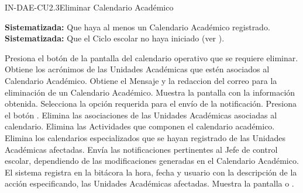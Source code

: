 \begin{UseCase}{IN-DAE-CU2.3}{Eliminar Calendario Académico}
{\begin{Titemize}
			\Titem \textbf{Sistematizada:} Que haya al menos un Calendario Académico registrado.
			\Titem \textbf{Sistematizada:} Que el Ciclo escolar no haya iniciado (ver ).
		\end{Titemize}	
	}
\end{UseCase}



\begin{UCtrayectoria}
	\UCpaso [\UCactor] Presiona el botón  de la pantalla  del calendario operativo que se requiere eliminar.
	\UCpaso Obtiene los acrónimos de las Unidades Académicas que estén asociados al Calendario Académico. 
	\UCpaso Obtiene el Mensaje  y la redaccion del correo  para la eliminación de un Calendario Académico.
	\UCpaso \label{IN-DAE-CU2.3:noti} Muestra la pantalla  con la información obtenida. 
	\UCpaso [\UCactor] Selecciona la opción requerida para el envío de la notificación.
	\UCpaso [\UCactor] Presiona el botón . 
	\UCpaso Elimina las asociaciones de las Unidades Académicas asociadas al calendario.
	\UCpaso Elimina las Actividades que componen el calendario académico.
	\UCpaso Elimina los calendarios especializados que se hayan registrado de las Unidades Académicas afectadas.
   	\UCpaso Envía las notificaciones pertinentes al Jefe de control escolar, dependiendo de las modificaciones generadas en el Calendario Académico.
    \UCpaso El sistema registra en la bitácora la hora, fecha y usuario con la descripción de la acción especificando, las Unidades Académicas afectadas.
	\UCpaso Muestra la pantalla  o .
\end{UCtrayectoria}



